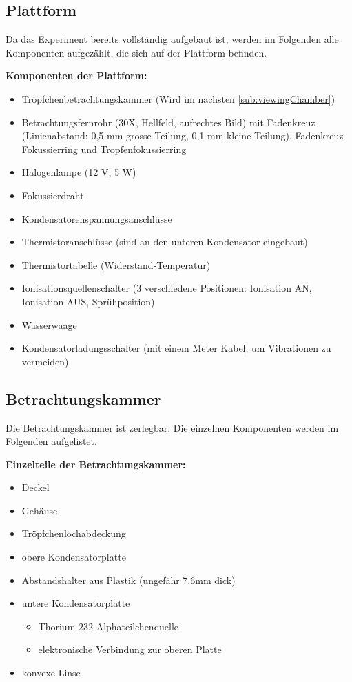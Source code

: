 \subsection{Plattform}\label{sub:inhaltApparatur}
Da das Experiment bereits vollständig aufgebaut ist, werden im Folgenden alle Komponenten aufgezählt, die sich auf der Plattform befinden.

\noindent \textbf{Komponenten der Plattform:}

\begin{itemize}\label{item:apparatur}
	\item Tröpfchenbetrachtungskammer (Wird im nächsten \autoref{sub:viewingChamber})
	\item Betrachtungsfernrohr (30X, Hellfeld, aufrechtes Bild) mit Fadenkreuz (Linienabstand: 0,5 mm grosse Teilung, 0,1 mm kleine Teilung), Fadenkreuz-Fokussierring und Tropfenfokussierring
	\item Halogenlampe (12 V, 5 W)
	\item Fokussierdraht
	\item Kondensatorenspannungsanschlüsse
	\item Thermistoranschlüsse (sind an den unteren Kondensator eingebaut)
	\item Thermistortabelle (Widerstand-Temperatur)
	\item Ionisationsquellenschalter (3 verschiedene Positionen: Ionisation AN, Ionisation AUS, Sprühposition)
	\item Wasserwaage
	\item Kondensatorladungsschalter (mit einem Meter Kabel, um Vibrationen zu vermeiden)
\end{itemize}


\subsection{Betrachtungskammer}\label{sub:viewingChamber}
Die Betrachtungskammer ist zerlegbar. Die einzelnen Komponenten werden im Folgenden aufgelistet.

\noindent \textbf{Einzelteile der Betrachtungskammer:}

\begin{itemize}\label{item:betrachtungskammer}
	\item Deckel
	\item Gehäuse
	\item Tröpfchenlochabdeckung
	\item obere Kondensatorplatte
	\item Abstandshalter aus Plastik (ungefähr 7.6mm dick)
	\item untere Kondensatorplatte
	\begin{itemize}
		\item Thorium-232 Alphateilchenquelle
		\item elektronische Verbindung zur oberen Platte
	\end{itemize}
	\item konvexe Linse
\end{itemize}

